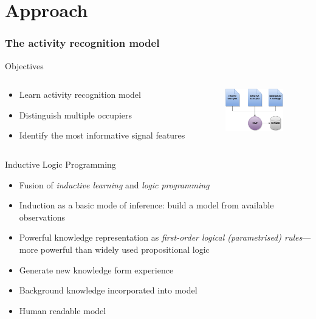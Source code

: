 \documentclass[10pt]{beamer}
\begin{document}
\section{Approach}

\begin{frame}[plain]
  \frametitle{The activity recognition model}

    \begin{block}{Objectives}
    \begin{columns}
      \begin{column}{8cm}
      \begin{itemize}
        \item Learn activity recognition model
        \item Distinguish multiple occupiers
        \item Identify the most informative signal features
      \end{itemize}
      \end{column}

    \begin{column}{2cm}
      \hspace*{-1cm}\includegraphics[width=2.5cm]{../paper/gfx/ilp}
    \end{column}

    \end{columns}
    \end{block}

    \begin{block}{Inductive Logic Programming~\cite{muggleton1994inductive,muggleton1995inverse}}
      \begin{itemize}
        \item Fusion of \emph{inductive learning} and \emph{logic programming}
        \item Induction as a basic mode of inference: build a model from available observations
        \item Powerful knowledge representation as \emph{first-order logical (parametrised) rules}---more powerful than widely used propositional logic

        \item Generate new knowledge form experience
        \item Background knowledge incorporated into model
        \item Human readable model
      \end{itemize}
    \end{block}

\end{frame}
\end{document}
